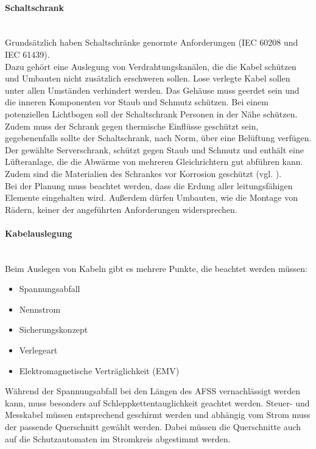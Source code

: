     \paragraph{Schaltschrank}\mbox{}\\
    Grundsätzlich haben Schaltschränke genormte Anforderungen (IEC 60208 und IEC 61439).\\
    Dazu gehört eine Auslegung von Verdrahtungskanälen, die die Kabel schützen und Umbauten nicht zusätzlich erschweren sollen. Lose verlegte Kabel sollen unter allen Umständen verhindert werden. Das Gehäuse muss geerdet sein und die inneren Komponenten vor Staub und Schmutz schützen. Bei einem potenziellen Lichtbogen soll der Schaltschrank Personen in der Nähe schützen. Zudem muss der Schrank gegen thermische Einflüsse geschützt sein, gegebenenfalls sollte der Schaltschrank, nach Norm, über eine Belüftung verfügen.\\
    Der gewählte Serverschrank, schützt gegen Staub und Schmutz und enthält eine Lüfteranlage, die die Abwärme von mehreren Gleichrichtern gut abführen kann. Zudem sind die Materialien des Schrankes vor Korrosion geschützt (vgl. \cite{Schaltschrank-Anforderungen}).\\
    Bei der Planung muss beachtet werden, dass die Erdung aller leitungsfähigen Elemente eingehalten wird. Außerdem dürfen Umbauten, wie die Montage von Rädern, keiner der angeführten Anforderungen widersprechen.

    \paragraph{Kabelauslegung}\mbox{}\\
    Beim Auslegen von Kabeln gibt es mehrere Punkte, die beachtet werden müssen:
    \begin{itemize}
        \item Spannungsabfall
        \item Nennstrom
        \item Sicherungskonzept
        \item Verlegeart
        \item Elektromagnetische Verträglichkeit (EMV)
    \end{itemize} 
    Während der Spannungsabfall bei den Längen des AFSS vernachlässigt werden kann, muss besonders auf Schleppkettentauglichkeit geachtet werden. Steuer- und Messkabel müssen entsprechend geschirmt werden und abhängig vom Strom muss der passende Querschnitt gewählt werden. Dabei müssen die Querschnitte auch auf die Schutzautomaten im Stromkreis abgestimmt werden.

